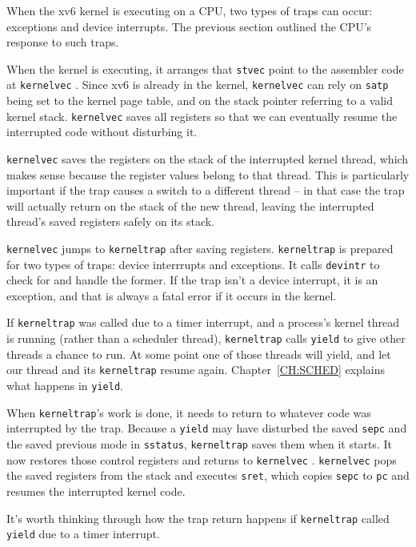 When the xv6 kernel is executing on a CPU, two types of traps can
occur: exceptions and device interrupts. The previous section outlined
the CPU's response to such traps.

When the kernel is executing, it arranges that {\tt stvec} point
to the assembler code at {\tt kernelvec}
.
Since xv6 is already in the kernel, {\tt kernelvec} can rely
on {\tt satp} being set to the kernel page table, and on the
stack pointer referring to a valid kernel stack.
{\tt kernelvec} saves all registers so that we can
eventually resume the interrupted code without disturbing it.

{\tt kernelvec} saves the registers on the stack of the interrupted
kernel thread, which makes sense because the register values belong to
that thread. This is particularly important if the trap causes a
switch to a different thread -- in that case the trap will actually
return on the stack of the new thread, leaving the interrupted
thread's saved registers safely on its stack.

{\tt kernelvec} jumps to {\tt kerneltrap}
 after saving registers.
{\tt kerneltrap} is prepared for two types of traps:
device interrrupts and exceptions. It calls
{\tt devintr}
to check for and handle the former.
If the trap isn't a device interrupt, it is an exception,
and that is always a fatal error if it occurs in the kernel.

If {\tt kerneltrap} was called due to a timer interrupt, and a
process's kernel thread is running (rather than a scheduler thread),
{\tt kerneltrap} calls {\tt yield} to give other threads a chance to
run. At some point one of those threads will yield, and let our thread
and its {\tt kerneltrap} resume again.
Chapter~\ref{CH:SCHED} explains what happens in {\tt yield}.

When {\tt kerneltrap}'s work is done, it needs to return to whatever
code was interrupted by the trap. Because a {\tt yield} may have
disturbed the saved {\tt sepc} and the saved previous mode in {\tt sstatus},
{\tt kerneltrap} saves them when it starts. It now restores those
control registers and returns to {\tt kernelvec}
.
{\tt kernelvec} pops the saved registers from the stack and
executes {\tt sret}, which copies {\tt sepc} to {\tt pc}
and resumes the interrupted kernel code.

It's worth thinking through how the trap return happens if
{\tt kerneltrap} called {\tt yield} due to a timer interrupt.

